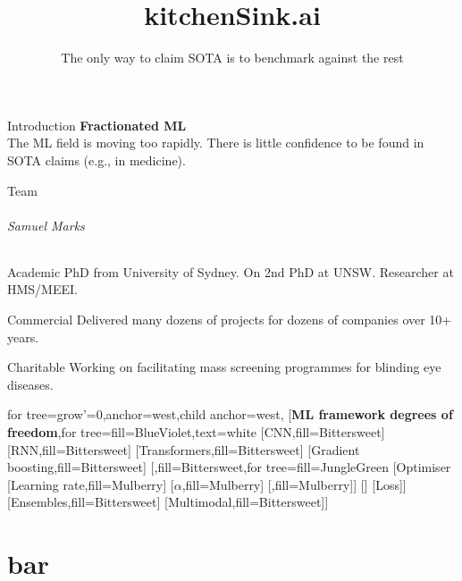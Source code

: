 \documentclass[aspectratio=169,xcolor=dvipsnames]{beamer}
\title{kitchenSink.ai}
\subtitle{The only way to claim SOTA is to benchmark against the rest}
\institute{}%
\date{}
\begin{document}
\begin{frame}[plain]
	\titlepage
\end{frame}

\begin{frame}{Introduction}
	\textbf{Fractionated ML}\\
	The ML field is moving too rapidly. There is little confidence to be found in SOTA claims (e.g., in medicine).
\end{frame}

\begin{frame}{Team}
	\framesubtitle{Samuel Marks}
	\begin{block}{Academic}
		PhD from University of Sydney. On 2nd PhD at UNSW. Researcher at HMS/MEEI.
	\end{block}

	\begin{exampleblock}{Commercial}
		Delivered many dozens of projects for dozens of companies over 10+ years.
	\end{exampleblock}

	\begin{alertblock}{Charitable}
		Working on facilitating mass screening programmes for blinding eye diseases.
	\end{alertblock}
\end{frame}

\begin{frame}
	\begin{forest} for tree={grow'=0,anchor=west,child anchor=west},
		[\textbf{ML framework degrees of freedom},for tree={fill=BlueViolet,text=white}
								[CNN,fill=Bittersweet]
								[RNN,fill=Bittersweet]
								[Transformers,fill=Bittersweet]
								[Gradient boosting,fill=Bittersweet]
								[\textellipsis{},fill=Bittersweet,for tree={fill=JungleGreen}
									[Optimiser
									[Learning rate,fill=Mulberry]
									[\(\alpha\),fill=Mulberry]
									[\textellipsis{},fill=Mulberry]]
									[\textellipsis{}]
									[Loss]]
								[Ensembles,fill=Bittersweet]
								[Multimodal,fill=Bittersweet]]%
	\end{forest}
\end{frame}

\part[foo]{bar}
\end{document}
